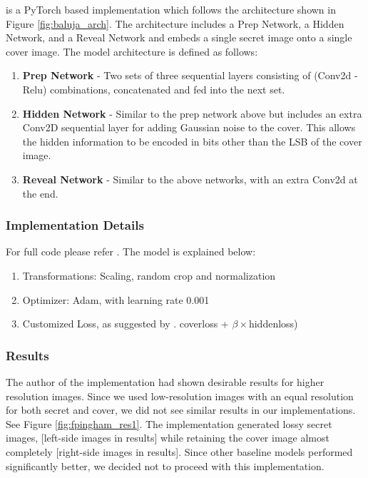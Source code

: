 \documentclass{article}
\begin{document}
\cite{fpingham} is a PyTorch based implementation which follows the architecture shown in Figure \ref{fig:baluja_arch}. The architecture includes a Prep Network, a Hidden Network, and a Reveal Network and embeds a single secret image onto a single cover image. The model architecture is defined as follows: 
\begin{enumerate}
    \item \textbf{Prep Network} - Two sets of three sequential layers consisting of (Conv2d - Relu) combinations, concatenated and fed into the next set.
    \item \textbf{Hidden Network} - Similar to the prep network above but includes an extra Conv2D sequential layer for adding Gaussian noise to the cover. This allows the hidden information to be encoded in bits other than the LSB of the cover image.
    \item \textbf{Reveal Network} - Similar to the above networks, with an extra Conv2d at the end.
 \end{enumerate}

\subsubsection{Implementation Details}
For full code please refer \href{https://drive.google.com/open?id=1lzJdYhmjusQxJKZQTnoGU9WUqsaEvxIC}{\color{blue}{here}}. The model is explained below:
\begin{enumerate}
\itemsep0em 
\item Transformations: Scaling, random crop and normalization
\item Optimizer: Adam, with learning rate 0.001
\item Customized Loss, as suggested by \cite{NIPS2017_6802}. coverloss + $\beta \times$hiddenloss)
\end{enumerate}

\subsubsection{Results}

The author of the implementation had shown desirable results for higher resolution images. Since we used low-resolution images with an equal resolution for both secret and cover, we did not see similar results in our implementations. See Figure \ref{fig:fpingham_res1}. The implementation generated lossy secret images, [left-side images in results] while retaining the cover image almost completely [right-side images in results]. Since other baseline models performed significantly better, we decided not to proceed with this implementation.
\end{document}
